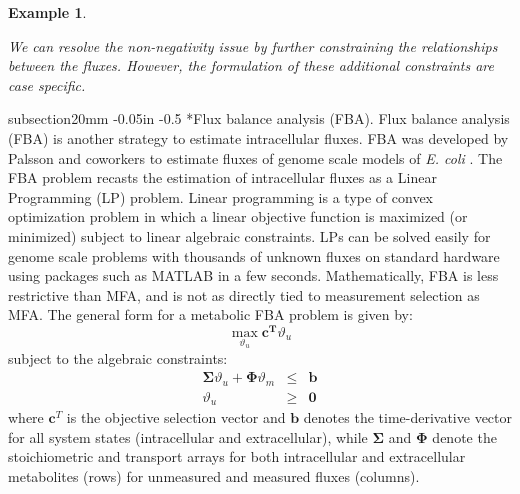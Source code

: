 \documentclass[11pt]{article}
\makeatletter
\newtheorem{example}{Example}[section]
\theoremstyle{definition}
\renewcommand\subsection{\@startsection
	{subsection}{2}{0mm}
	{-0.05in}
	{-0.5\baselineskip}
	{\normalfont\normalsize\bfseries}}
\makeatother
\begin{document}
\begin{example}
	\begin{figure*}[h!]\centering
	\caption{Example flux solution for $q_{1} = 1.0$ and $q_{2} = 0.5$. While the overall material balance is consistent, some estimated intracellular fluxes ($v_{3}$ and $v_{4}$) violate non-negativity. }\label{fig-bad-flux-solution}
	\end{figure*}
	We can resolve the non-negativity issue by further constraining the relationships between the fluxes.
	However, the formulation of these additional constraints are case specific.

\end{example}

\subsection*{Flux balance analysis (FBA).}
Flux balance analysis (FBA) is another strategy to estimate intracellular fluxes.
FBA was developed by Palsson and coworkers to estimate fluxes of genome scale models of \emph{E. coli} \citep{Edwards:2000yq}.
The FBA problem recasts the estimation of intracellular fluxes as a Linear Programming (LP) problem.
Linear programming is a type of convex optimization problem in which a linear objective function is maximized (or minimized) subject to linear algebraic constraints.
LPs can be solved easily for genome scale problems with thousands of unknown fluxes on standard hardware using packages such as MATLAB in a few seconds.
Mathematically, FBA is less restrictive than MFA, and is not as directly tied to measurement selection as MFA.
The general form for a metabolic FBA problem is given by:
\begin{equation}
	\max_{\vartheta_{u}}\mathbf{c^{T}}\vartheta_{u}
\end{equation}
subject to the algebraic constraints:
\begin{eqnarray}
	\mathbf{\Sigma}\vartheta_{u} + \mathbf{\Phi}\vartheta_{m} &\leq& \mathbf{b} \\
	\vartheta_{u}&\geq&\mathbf{0}
\end{eqnarray}
where $\mathbf{c}^{T}$ is the objective selection vector and $\mathbf{b}$ denotes the time-derivative vector for all system states (intracellular and extracellular), while
$\mathbf{\Sigma}$ and $\mathbf{\Phi}$ denote the stoichiometric and transport arrays for both intracellular and extracellular metabolites (rows) for unmeasured and measured fluxes (columns).
\end{document}
